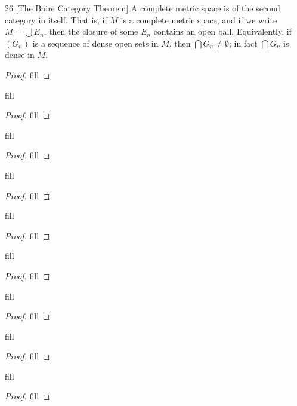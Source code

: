 \begin{exercise}{26 [The Baire Category Theorem]}
A complete metric space is of the second category in itself.
That is, if $M$ is a complete metric space, and if we write $M = \bigcup E_n$, then the closure of some $E_n$ contains an open ball.
Equivalently, if $(G_n)$ is a sequence of dense open sets in $M$, then $\bigcap G_n \neq \emptyset$;
in fact $\bigcap G_n$ is dense in $M$.
\end{exercise}
\begin{proof}
fill
\end{proof} 

\begin{exercise}{28}
fill
\end{exercise}
\begin{proof}
fill
\end{proof} 

\begin{exercise}{29}
fill
\end{exercise}
\begin{proof}
fill
\end{proof} 

\begin{exercise}{30}
fill
\end{exercise}
\begin{proof}
fill
\end{proof} 

\begin{exercise}{31}
fill
\end{exercise}
\begin{proof}
fill
\end{proof} 

\begin{exercise}{32}
fill
\end{exercise}
\begin{proof}
fill
\end{proof} 

\begin{exercise}{33}
fill
\end{exercise}
\begin{proof}
fill
\end{proof} 

\begin{exercise}{36}
fill
\end{exercise}
\begin{proof}
fill
\end{proof} 

\begin{exercise}{37}
fill
\end{exercise}
\begin{proof}
fill
\end{proof} 

